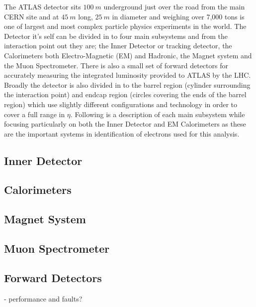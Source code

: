 The ATLAS detector sits $100~m$ underground just over the road from the main CERN site and at $45~m$ long, $25~m$ in diameter and weighing over 7,000 tons is one of largest and most complex particle physics experiments in the world. The Detector it's self can be divided in to four main subsystems and from the interaction point out they are; the Inner Detector or tracking detector, the Calorimeters both Electro-Magnetic (EM) and Hadronic, the Magnet system and the Muon Spectrometer. There is also a small set of forward detectors for accurately measuring the integrated luminosity provided to ATLAS by the LHC. Broadly the detector is also divided in to the barrel region (cylinder surrounding the interaction point) and endcap region (circles covering the ends of the barrel region) which use slightly different configurations and technology in order to cover a full range in $\eta$.
Following is a description of each main subsystem while focusing particularly on both the Inner Detector and EM Calorimeters as these are the important systems in identification of electrons used for this analysis.

\subsection{Inner Detector}
\subsection{Calorimeters}
\subsection{Magnet System}
\subsection{Muon Spectrometer}
\subsection{Forward Detectors}


- performance and faults?



